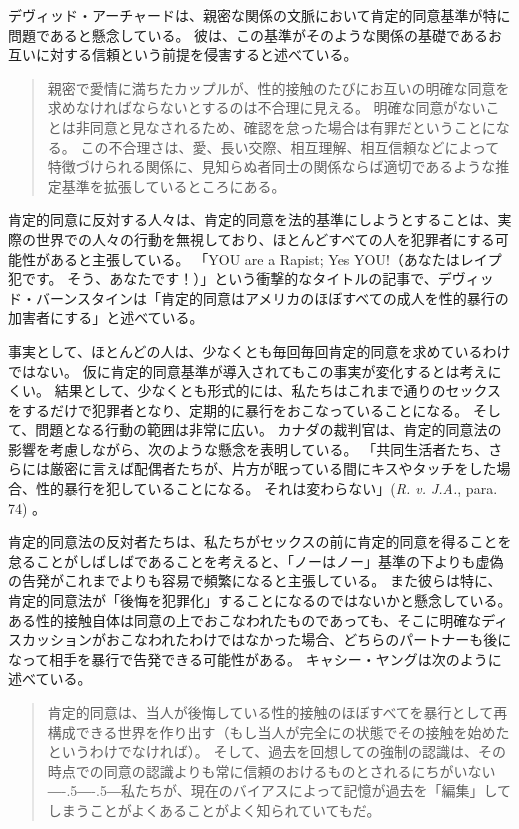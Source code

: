 \documentclass[paper=a4,book,openany]{jlreq}
\newcommand{\ig}[1]{}           %
\def\DDASH{―\kern-.5\zw―\kern-.5\zw―} %
\begin{document}
デヴィッド・アーチャードは、親密な関係の文脈において肯定的同意基準が特に問題であると懸念している。
彼は、この基準がそのような関係の基礎であるお互いに対する信頼という前提を侵害すると述べている。

\begin{quote}
親密で愛情に満ちたカップルが、性的接触のたびにお互いの明確な同意を求めなければならないとするのは不合理に見える。
明確な同意がないことは非同意と見なされるため、確認を怠った場合は有罪だということになる。
この不合理さは、愛、長い交際、相互理解、相互信頼などによって特徴づけられる関係に、見知らぬ者同士の関係ならば適切であるような推定基準を拡張しているところにある。
\citep[p.146]{archard98:_sexual_consen}
\end{quote}

肯定的同意に反対する人々は、肯定的同意を法的基準にしようとすることは、実際の世界での人々の行動を無視しており、ほとんどすべての人を犯罪者にする可能性があると主張している。
「YOU are a Rapist; Yes YOU!（あなたはレイプ犯です。
そう、あなたです！）」という衝撃的なタイトルの記事で、デヴィッド・バーンスタイン\ig{David Bernstein}は「肯定的同意はアメリカのほぼすべての成人を性的暴行の加害者にする」と述べている\citep{bernstein14:_you_are_rapis}。
\ig{David Bernstein}
事実として、ほとんどの人は、少なくとも毎回毎回肯定的同意を求めているわけではない。
仮に肯定的同意基準が導入されてもこの事実が変化するとは考えにくい。
結果として、少なくとも形式的には、私たちはこれまで通りのセックスをするだけで犯罪者となり、定期的に暴行をおこなっていることになる。
そして、問題となる行動の範囲は非常に広い。
カナダの裁判官は、肯定的同意法の影響を考慮しながら、次のような懸念を表明している。
「共同生活者たち、さらには厳密に言えば配偶者たちが、片方が眠っている間にキスやタッチをした場合、性的暴行を犯していることになる。
それは変わらない」(\emph{R. v. J.A.}, \ig{2011 SCC 28,} para. 74\ig{\footnote{\url{https://scc-csc.lexum.com/scc-csc/scc-csc/en/item/7942/index.do}.}}) 。

肯定的同意法の反対者たちは、私たちがセックスの前に肯定的同意を得ることを怠ることがしばしばであることを考えると、「ノーはノー」基準の下よりも虚偽の告発がこれまでよりも容易で頻繁になると主張している。
また彼らは特に、肯定的同意法が「後悔を犯罪化」することになるのではないかと懸念している。
ある性的接触自体は同意の上でおこなわれたものであっても、そこに明確なディスカッションがおこなわれたわけではなかった場合、どちらのパートナーも後になって相手を暴行で告発できる可能性がある。
キャシー・ヤングは次のように述べている。

\begin{quote}
肯定的同意は、当人が後悔している性的接触のほぼすべてを暴行として再構成できる世界を作り出す（もし当人が完全にの状態でその接触を始めたというわけでなければ）。
そして、過去を回想しての強制の認識は、その時点での同意の認識よりも常に信頼のおけるものとされるにちがいない{\DDASH}私たちが、現在のバイアスによって記憶が過去を「編集」してしまうことがよくあることがよく知られていてもだ。
\citep{young15:_femin_want_us_defin_these}
\end{quote}
\end{document}
